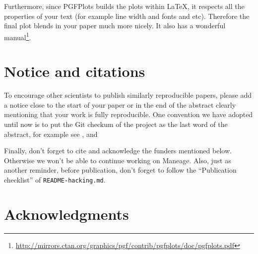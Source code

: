 \documentclass[10pt, twocolumn]{article}
\begin{document}
Furthermore, since {\small PGFP}lots builds the plots within \LaTeX{}, it respects all the properties of your text (for example line width and fonts and etc).
Therefore the final plot blends in your paper much more nicely.
It also has a wonderful manual\footnote{\url{http://mirrors.ctan.org/graphics/pgf/contrib/pgfplots/doc/pgfplots.pdf}}.

\begin{figure}[t]

\end{figure}



\section{Notice and citations}
To encourage other scientists to publish similarly reproducible papers, please add a notice close to the start of your paper or in the end of the abstract clearly mentioning that your work is fully reproducible.
One convention we have adopted until now is to put the Git checkum of the project as the last word of the abstract, for example see \citet{akhlaghi19}, \citet{infantesainz20} and \citet{maneage}

Finally, don't forget to cite \citet{maneage} and acknowledge the funders mentioned below.
Otherwise we won't be able to continue working on Maneage.
Also, just as another reminder, before publication, don't forget to follow the ``Publication checklist'' of \texttt{README-hacking.md}.





\section{Acknowledgments}
\end{document}
